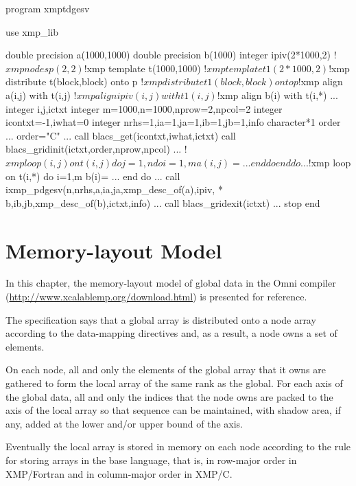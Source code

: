 \begin{description}
\begin{XFexample}
      program xmptdgesv

      use xmp_lib

      double precision a(1000,1000)
      double precision b(1000)
      integer ipiv(2*1000,2)
!$xmp nodes p(2,2)
!$xmp template t(1000,1000)
!$xmp template t1(2*1000,2)
!$xmp distribute t(block,block) onto p
!$xmp distribute t1(block,block) onto p
!$xmp align a(i,j) with t(i,j)
!$xmp align ipiv(i,j) with t1(i,j)
!$xmp align b(i) with t(i,*)
      ...
      integer i,j,ictxt
      integer m=1000,n=1000,nprow=2,npcol=2
      integer icontxt=-1,iwhat=0
      integer nrhs=1,ia=1,ja=1,ib=1,jb=1,info
      character*1 order
      ...
      order="C"
      ...
      call blacs_get(icontxt,iwhat,ictxt)
      call blacs_gridinit(ictxt,order,nprow,npcol)
      ...
!$xmp loop (i,j) on t(i,j)
      do j=1,n
         do i=1,m
            a(i,j) = ...
         end do
      end do
      ...
!$xmp loop on t(i,*)
      do i=1,m
         b(i)= ...
      end do
      ...
      call ixmp_pdgesv(n,nrhs,a,ia,ja,xmp_desc_of(a),ipiv,
     *                b,ib,jb,xmp_desc_of(b),ictxt,info)
      ...
      call blacs_gridexit(ictxt)
      ...
      stop
      end
\end{XFexample}
\end{description}


\chapter{Memory-layout Model}

In this chapter, the memory-layout model of global data in the Omni
{\XMP} compiler (\url{http://www.xcalablemp.org/download.html}) is
presented for reference.

The {\XMP} specification says that a global array is distributed onto
a node array according to the data-mapping directives and, as a
result, a node owns a set of elements.

On each node, all and only the elements of the global array that it
owns are gathered to form the local array of the same rank as the
global. For each axis of the global data, all and only the indices 
that the node owns are packed to the axis of the local array so that
sequence can be maintained, with shadow area, if any, added at the
lower and/or upper bound of the axis.

Eventually the local array is stored in memory on each node according
to the rule for storing arrays in the base language, that is, in
row-major order in XMP/Fortran and in column-major order in XMP/C.

